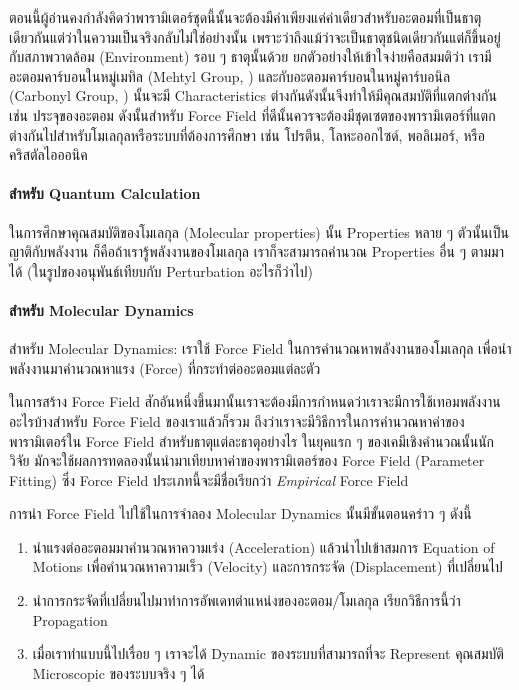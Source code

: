 ตอนนี้ผู้อ่านคงกำลังคิดว่าพารามิเตอร์ชุดนี้นั้นจะต้องมีค่าเพียงแค่ค่าเดียวสำหรับอะตอมที่เป็นธาตุเดียวกันแต่ว่าในความเป็นจริงกลับไม่ใช่อย่างนั้น%
เพราะว่าถึงแม้ว่าจะเป็นธาตุชนิดเดียวกันแต่ก็ขึ้นอยู่กับสภาพวาดล้อม (Environment) รอบ ๆ ธาตุนั้นด้วย ยกตัวอย่างให้เข้าใจง่ายคือสมมติว่า%
เรามีอะตอมคาร์บอนในหมู่เมทิล (Mehtyl Group, ) และกับอะตอมคาร์บอนในหมู่คาร์บอนิล (Carbonyl Group, )
นั้นจะมี Characteristics ต่างกันดังนั้นจึงทำให้มีคุณสมบัติที่แตกต่างกัน เช่น ประจุของอะตอม ดังนั้นสำหรับ Force Field
ที่ดีนั้นควรจะต้องมีชุดเซตของพารามิเตอร์ที่แตกต่างกันไปสำหรับโมเลกุลหรือระบบที่ต้องการศึกษา เช่น โปรตีน, โลหะออกไซด์, พอลิเมอร์, หรือคริสตัลไอออนิค

\paragraph{สำหรับ Quantum Calculation}
ในการศึกษาคุณสมบัติของโมเลกุล (Molecular properties) นั้น Properties หลาย ๆ ตัวนั้นเป็นญาติกับพลังงาน ก็คือถ้าเรารู้พลังงานของโมเลกุล
เราก็จะสามารถคำนวณ Properties อื่น ๆ ตามมาได้ (ในรูปของอนุพันธ์เทียบกับ Perturbation อะไรก็ว่าไป)

\paragraph{สำหรับ Molecular Dynamics}
สำหรับ Molecular Dynamics: เราใช้ Force Field ในการคำนวณหาพลังงานของโมเลกุล เพื่อนำพลังงานมาคำนวณหาแรง (Force)
ที่กระทำต่ออะตอมแต่ละตัว

ในการสร้าง Force Field สักอันหนึ่งขึ้นมานั้นเราจะต้องมีการกำหนดว่าเราจะมีการใช้เทอมพลังงานอะไรบ้างสำหรับ Force Field ของเราแล้วก็รวม%
ถึงว่าเราจะมีวิธีการในการคำนวณหาค่าของพารามิเตอร์ใน Force Field สำหรับธาตุแต่ละธาตุอย่างไร ในยุคแรก ๆ ของเคมีเชิงคำนวณนั้นนักวิจัย%
มักจะใช้ผลการทดลองนั้นนำมาเทียบหาค่าของพารามิเตอร์ของ Force Field (Parameter Fitting) ซึ่ง Force Field ประเภทนี้จะมีชื่อเรียกว่า
\textit{Empirical} Force Field

การนำ Force Field ไปใช้ในการจำลอง Molecular Dynamics นั้นมีขั้นตอนคร่าว ๆ ดังนี้

\begin{enumerate}[topsep=0pt,noitemsep]
  \setlength\itemsep{1em}
  \item นำแรงต่ออะตอมมาคำนวณหาความเร่ง (Acceleration) แล้วนำไปเข้าสมการ Equation of Motions
        เพื่อคำนวณหาความเร็ว (Velocity) และการกระจัด (Displacement) ที่เปลี่ยนไป

  \item นำการกระจัดที่เปลี่ยนไปมาทำการอัพเดทตำแหน่งของอะตอม/โมเลกุล เรียกวิธีการนี้ว่า Propagation

  \item เมื่อเราทำแบบนี้ไปเรื่อย ๆ เราจะได้ Dynamic ของระบบที่สามารถที่จะ Represent คุณสมบัติ Microscopic ของระบบจริง ๆ ได้
\end{enumerate}


